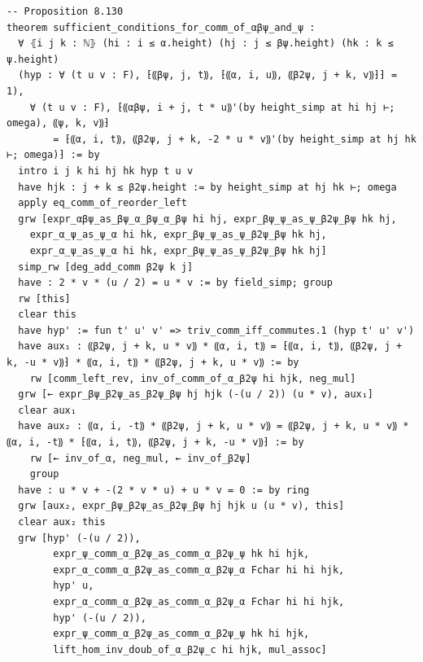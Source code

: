 \documentclass[10pt,a4paper]{article}
\begin{document}
\begin{Verbatim}
-- Proposition 8.130
theorem sufficient_conditions_for_comm_of_αβψ_and_ψ :
  ∀ ⦃i j k : ℕ⦄ (hi : i ≤ α.height) (hj : j ≤ βψ.height) (hk : k ≤ ψ.height)
  (hyp : ∀ (t u v : F), ⁅⸨βψ, j, t⸩, ⁅⸨α, i, u⸩, ⸨β2ψ, j + k, v⸩⁆⁆ = 1),
    ∀ (t u v : F), ⁅⸨αβψ, i + j, t * u⸩'(by height_simp at hi hj ⊢; omega), ⸨ψ, k, v⸩⁆
        = ⁅⸨α, i, t⸩, ⸨β2ψ, j + k, -2 * u * v⸩'(by height_simp at hj hk ⊢; omega)⁆ := by
  intro i j k hi hj hk hyp t u v
  have hjk : j + k ≤ β2ψ.height := by height_simp at hj hk ⊢; omega
  apply eq_comm_of_reorder_left
  grw [expr_αβψ_as_βψ_α_βψ_α_βψ hi hj, expr_βψ_ψ_as_ψ_β2ψ_βψ hk hj,
    expr_α_ψ_as_ψ_α hi hk, expr_βψ_ψ_as_ψ_β2ψ_βψ hk hj,
    expr_α_ψ_as_ψ_α hi hk, expr_βψ_ψ_as_ψ_β2ψ_βψ hk hj]
  simp_rw [deg_add_comm β2ψ k j]
  have : 2 * v * (u / 2) = u * v := by field_simp; group
  rw [this]
  clear this
  have hyp' := fun t' u' v' => triv_comm_iff_commutes.1 (hyp t' u' v')
  have aux₁ : ⸨β2ψ, j + k, u * v⸩ * ⸨α, i, t⸩ = ⁅⸨α, i, t⸩, ⸨β2ψ, j + k, -u * v⸩⁆ * ⸨α, i, t⸩ * ⸨β2ψ, j + k, u * v⸩ := by
    rw [comm_left_rev, inv_of_comm_of_α_β2ψ hi hjk, neg_mul]
  grw [← expr_βψ_β2ψ_as_β2ψ_βψ hj hjk (-(u / 2)) (u * v), aux₁]
  clear aux₁
  have aux₂ : ⸨α, i, -t⸩ * ⸨β2ψ, j + k, u * v⸩ = ⸨β2ψ, j + k, u * v⸩ * ⸨α, i, -t⸩ * ⁅⸨α, i, t⸩, ⸨β2ψ, j + k, -u * v⸩⁆ := by
    rw [← inv_of_α, neg_mul, ← inv_of_β2ψ]
    group
  have : u * v + -(2 * v * u) + u * v = 0 := by ring
  grw [aux₂, expr_βψ_β2ψ_as_β2ψ_βψ hj hjk u (u * v), this]
  clear aux₂ this
  grw [hyp' (-(u / 2)),
        expr_ψ_comm_α_β2ψ_as_comm_α_β2ψ_ψ hk hi hjk,
        expr_α_comm_α_β2ψ_as_comm_α_β2ψ_α Fchar hi hi hjk,
        hyp' u,
        expr_α_comm_α_β2ψ_as_comm_α_β2ψ_α Fchar hi hi hjk,
        hyp' (-(u / 2)),
        expr_ψ_comm_α_β2ψ_as_comm_α_β2ψ_ψ hk hi hjk,
        lift_hom_inv_doub_of_α_β2ψ_c hi hjk, mul_assoc]
\end{Verbatim}
\end{document}
